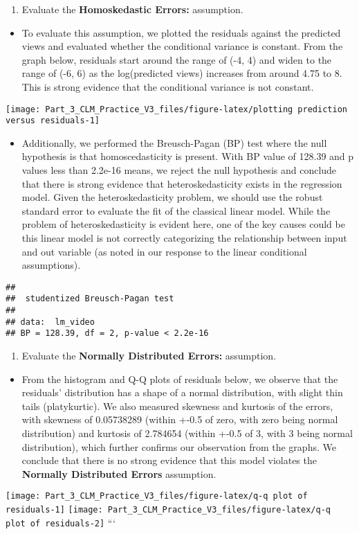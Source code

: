 \documentclass[
]{article}
\providecommand{\tightlist}{%
  \setlength{\itemsep}{0pt}\setlength{\parskip}{0pt}}
\begin{document}
\begin{enumerate}
\def\labelenumi{\arabic{enumi}.}
\setcounter{enumi}{3}
\tightlist
\item
  Evaluate the \textbf{Homoskedastic Errors:} assumption.
\end{enumerate}

\begin{itemize}
\tightlist
\item
  To evaluate this assumption, we plotted the residuals against the
  predicted views and evaluated whether the conditional variance is
  constant. From the graph below, residuals start around the range of
  (-4, 4) and widen to the range of (-6, 6) as the log(predicted views)
  increases from around 4.75 to 8. This is strong evidence that the
  conditional variance is not constant.
\end{itemize}

\texttt{[image: Part\_3\_CLM\_Practice\_V3\_files/figure-latex/plotting prediction versus residuals-1]}

\begin{itemize}
\tightlist
\item
  Additionally, we performed the Breusch-Pagan (BP) test where the null
  hypothesis is that homoscedasticity is present. With BP value of
  128.39 and p values less than 2.2e-16 means, we reject the null
  hypothesis and conclude that there is strong evidence that
  heteroskedasticity exists in the regression model. Given the
  heteroskedasticity problem, we should use the robust standard error to
  evaluate the fit of the classical linear model. While the problem of
  heteroskedasticity is evident here, one of the key causes could be
  this linear model is not correctly categorizing the relationship
  between input and out variable (as noted in our response to the linear
  conditional assumptions).
\end{itemize}

\begin{verbatim}
## 
##  studentized Breusch-Pagan test
## 
## data:  lm_video
## BP = 128.39, df = 2, p-value < 2.2e-16
\end{verbatim}

\begin{enumerate}
\def\labelenumi{\arabic{enumi}.}
\setcounter{enumi}{4}
\tightlist
\item
  Evaluate the \textbf{Normally Distributed Errors:} assumption.
\end{enumerate}

\begin{itemize}
\tightlist
\item
  From the histogram and Q-Q plots of residuals below, we observe that
  the residuals' distribution has a shape of a normal distribution, with
  slight thin tails (platykurtic). We also measured skewness and
  kurtosis of the errors, with skewness of 0.05738289 (within +-0.5 of
  zero, with zero being normal distribution) and kurtosis of 2.784654
  (within +-0.5 of 3, with 3 being normal distribution), which further
  confirms our observation from the graphs. We conclude that there is no
  strong evidence that this model violates the \textbf{Normally
  Distributed Errors} assumption.
\end{itemize}

\texttt{[image: Part\_3\_CLM\_Practice\_V3\_files/figure-latex/q-q plot of residuals-1]}
\texttt{[image: Part\_3\_CLM\_Practice\_V3\_files/figure-latex/q-q plot of residuals-2]}
```
\end{document}
